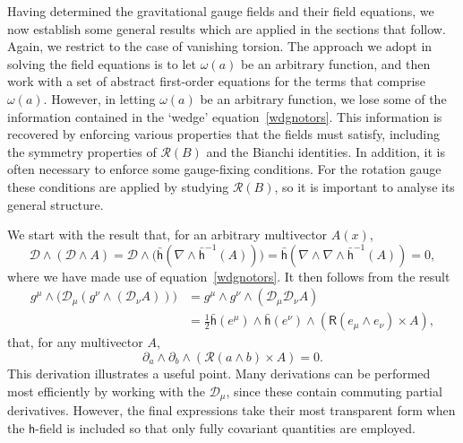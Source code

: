 \documentclass[a4paper]{article}
\numberwithin{equation}{section}
\newcommand{\nn}{\nonumber}
\newcommand{\wdg}{\! \wedge \!}
\newcommand{\crs}{\! \times \!}
\newcommand{\half}{{\textstyle \frac{1}{2}}}
\newcommand{\om}{\omega}
\newcommand{\cld}{{\mathcal{D}}}
\newcommand{\clr}{{\mathcal{R}}}
\newcommand{\da}{\partial_a}
\newcommand{\db}{\partial_b}
\newcommand{\lih}{\mathsf{h}}
\newcommand{\lbh}{\bar{\mathsf{h}}}
\newcommand{\liR}{\mathsf{R}}
\newcommand{\ho}{\lbh}
\newcommand{\grad}{\nabla}
\begin{document}
Having determined the gravitational gauge fields and their field
equations, we now establish some general results which are applied in
the sections that follow.  Again, we restrict to the case of vanishing
torsion.  The approach we adopt in solving the field equations is to
let $\om(a)$ be an arbitrary function, and then work with a set of
abstract first-order equations for the terms that comprise $\om(a)$.
However, in letting $\om(a)$ be an arbitrary function, we lose some of
the information contained in the `wedge' equation~\eqref{wdgnotors}.  This
information is recovered by enforcing various properties that the
fields must satisfy, including the symmetry properties of $\clr(B)$
and the Bianchi identities.  In addition, it is often necessary to
enforce some gauge-fixing conditions.  For the rotation gauge these
conditions are applied by studying $\clr(B)$, so it is important to
analyse its general structure.


We start with the result that, for an arbitrary multivector $A(x)$,
%
\begin{equation}
\cld \wdg (\cld \wdg A) = \cld \wdg \bigl( \ho(\grad \wdg \ho^{-1}(A))
\bigr) = \ho(\grad \wdg \grad \wdg \ho^{-1}(A)) = 0,
\end{equation} 
%
where we have made use of equation~\eqref{wdgnotors}.  It then follows
from the result
%
\begin{align}
g^\mu \wdg \bigl( \cld_\mu ( g^\nu \wdg (\cld_\nu A)) \bigr)
&= g^\mu \wdg g^\nu \wdg ( \cld_\mu \cld_\nu A ) \nn \\
&= \half \ho(e^\mu) \wdg
\ho(e^\nu) \wdg ( \liR(e_\mu \wdg e_\nu) \crs A),
\end{align}
%
that, for any multivector $A$,
%
\begin{equation}
\da \wdg \db \wdg (\clr(a \wdg b) \crs A) = 0.
\label{S-3}
\end{equation}
% 
This derivation illustrates a useful point.  Many derivations can be
performed most efficiently by working with the $\cld_\mu$, since these
contain commuting partial derivatives.  However, the final expressions
take their most transparent form when the $\lih$-field is included so
that only fully covariant quantities are employed.
\end{document}
